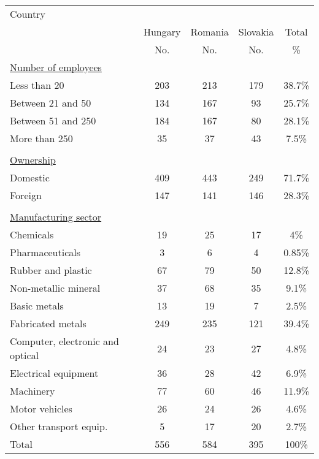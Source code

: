 
\begin{tabular}{lccc|c} 
\toprule
	Country		\\
	&Hungary	&Romania & Slovakia & Total \\
	&No. &No. &No. & \% \\
	\midrule
\ul{Number of employees}	&&&& \\			
Less than 20 &	203	&213&	179&	38.7\% \\
Between 21 and 50&	134&	167&	93	& 25.7\%\\
Between 51 and 250	&184	&167	&80	& 28.1\% \\
More than 250	&35&	37&	43	& 7.5\% \\
&&&&& \\
\ul{Ownership} &&&& \\				
Domestic	&409	&443	&249	& 71.7\% \\
Foreign	&147	&141	&146	& 28.3\% \\
&&&&& \\
\ul{Manufacturing sector} &&&&\\				
Chemicals & 	19 &	25 &	17	& 4\% \\
Pharmaceuticals&	3	&6	&4	& 0.85\% \\
Rubber and plastic &	67&	79&	50&	12.8\%\\
Non-metallic mineral&	37&	68&	35&	9.1\% \\
Basic metals	&13	&19	&7	& 2.5\%\\
Fabricated metals &	249	&235	&121&	39.4\%\\
Computer, electronic and optical &	24	&23&	27&	4.8\% \\
Electrical equipment	&36	&28	&42	& 6.9\% \\
Machinery &77	&60&	46&	11.9\%\\
Motor vehicles&	26&	24&	26&	4.6\%\\
Other transport equip. &	5	&17	&20	& 2.7\% \\
\midrule

Total	&556	&584	&395	& 100\% \\
\bottomrule
\end{tabular}
